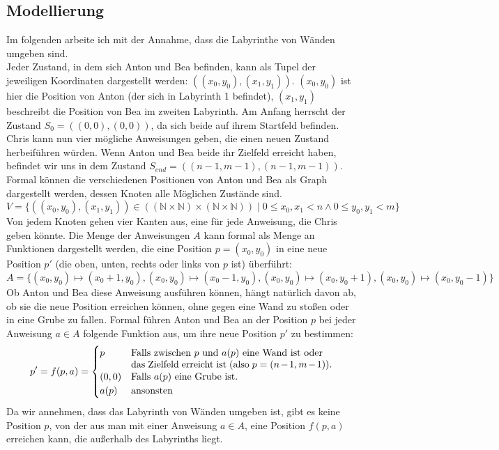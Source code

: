 \documentclass[a4paper,10pt,ngerman]{scrartcl}
\begin{document}
    \subsection{Modellierung}
    Im folgenden arbeite ich mit der Annahme, dass die Labyrinthe von Wänden umgeben sind. \\
    Jeder Zustand, in dem sich Anton und Bea befinden, kann als Tupel der jeweiligen Koordinaten dargestellt werden: $((x_0,y_0), (x_1, y_1))$.
    $(x_0,y_0)$ ist hier die Position von Anton (der sich in Labyrinth 1 befindet), $(x_1, y_1)$ beschreibt die Position von Bea im zweiten Labyrinth.
    Am Anfang herrscht der Zustand $S_0 = ((0,0), (0,0))$, da sich beide auf ihrem Startfeld befinden. Chris kann nun vier mögliche Anweisungen geben, die einen neuen Zustand herbeiführen würden. Wenn Anton und Bea beide ihr Zielfeld erreicht haben, befindet wir uns in dem Zustand $S_{end} = ((n-1, m-1), (n-1, m-1))$.\\
    Formal können die verschiedenen Positionen von Anton und Bea als Graph dargestellt werden, dessen Knoten alle Möglichen Zustände sind.
    \[ V = \{((x_0, y_0), (x_1, y_1)) \in ((\mathbb{N} \times \mathbb{N}) \times (\mathbb{N} \times \mathbb{N}))\mid 0 \le x_0, x_1 < n \land 0 \le y_0, y_1 < m\}\]
    Von jedem Knoten gehen vier Kanten aus, eine für jede Anweisung, die Chris geben könnte. Die Menge der Anweisungen $A$ kann formal als Menge an Funktionen dargestellt werden, die eine Position $p = (x_0, y_0)$ in eine neue Position $p'$ (die oben, unten, rechts oder links von $p$ ist) überführt: \[A = \{(x_0, y_0) \mapsto (x_0 + 1, y_0), (x_0, y_0) \mapsto (x_0 - 1, y_0), (x_0, y_0) \mapsto (x_0, y_0 + 1), (x_0, y_0) \mapsto (x_0, y_0 - 1)\}\]
    Ob Anton und Bea diese Anweisung ausführen können, hängt natürlich davon ab, ob sie die neue Position erreichen können, ohne gegen eine Wand zu stoßen oder in eine Grube zu fallen. Formal führen Anton und Bea an der Position $p$ bei jeder Anweisung $a \in A$ folgende Funktion aus, um ihre neue Position $p'$ zu bestimmen:
    \[p' = f(p, a) =
    \begin{cases}
        p & \parbox[t]{.6\textwidth}{Falls zwischen $p$ und $a(p)$ eine Wand ist oder \\ das Zielfeld erreicht ist (also $p = (n-1, m-1)$).} \\
        (0, 0)  & \text {Falls $a(p)$ eine Grube ist.}\\
        a(p) & \text{ansonsten} \\
    \end{cases}\]
    Da wir annehmen, dass das Labyrinth von Wänden umgeben ist, gibt es keine Position $p$, von der aus man mit einer Anweisung $a \in A$, eine Position $f(p,a)$ erreichen kann, die außerhalb des Labyrinths liegt. \\
\end{document}
